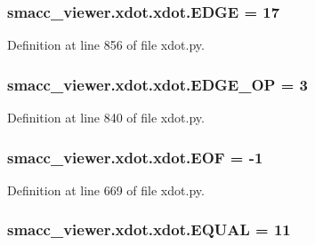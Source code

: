 \subsubsection[{\texorpdfstring{E\+D\+GE}{EDGE}}]{ smacc\+\_\+viewer.\+xdot.\+xdot.\+E\+D\+GE = 17}\hypertarget{namespacesmacc__viewer_1_1xdot_1_1xdot_a6fdd1e3a0389e81bba4fd2e4d6fb6986}{}\label{namespacesmacc__viewer_1_1xdot_1_1xdot_a6fdd1e3a0389e81bba4fd2e4d6fb6986}


Definition at line 856 of file xdot.\+py.

\subsubsection[{\texorpdfstring{E\+D\+G\+E\+\_\+\+OP}{EDGE_OP}}]{ smacc\+\_\+viewer.\+xdot.\+xdot.\+E\+D\+G\+E\+\_\+\+OP = 3}\hypertarget{namespacesmacc__viewer_1_1xdot_1_1xdot_a1afa4f3c0a80603cdbdac22dc041eb6f}{}\label{namespacesmacc__viewer_1_1xdot_1_1xdot_a1afa4f3c0a80603cdbdac22dc041eb6f}


Definition at line 840 of file xdot.\+py.

\subsubsection[{\texorpdfstring{E\+OF}{EOF}}]{ smacc\+\_\+viewer.\+xdot.\+xdot.\+E\+OF = -\/1}\hypertarget{namespacesmacc__viewer_1_1xdot_1_1xdot_a7c941e8b870bf032cc630687891e500d}{}\label{namespacesmacc__viewer_1_1xdot_1_1xdot_a7c941e8b870bf032cc630687891e500d}


Definition at line 669 of file xdot.\+py.

\subsubsection[{\texorpdfstring{E\+Q\+U\+AL}{EQUAL}}]{ smacc\+\_\+viewer.\+xdot.\+xdot.\+E\+Q\+U\+AL = 11}\hypertarget{namespacesmacc__viewer_1_1xdot_1_1xdot_a98b9706879e0c77d1876a4896c2fc44a}{}\label{namespacesmacc__viewer_1_1xdot_1_1xdot_a98b9706879e0c77d1876a4896c2fc44a}


